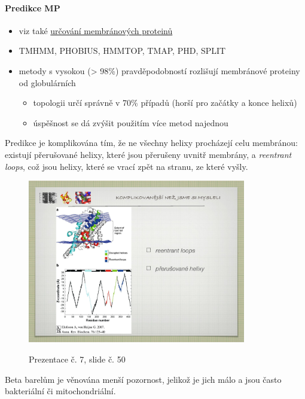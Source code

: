 \documentclass[DIV=8]{scrreprt}
\begin{document}
\paragraph{Predikce MP}
\begin{itemize}[nosep]
    \item viz také \href{Určování membránových proteinů}{určování membránových proteinů}
    \item TMHMM, PHOBIUS, HMMTOP, TMAP, PHD, SPLIT
    \item metody s vysokou (> 98\%) pravděpodobností rozlišují membránové proteiny od globulárních
\begin{itemize}[nosep]
    \item topologii určí správně v 70\% případů (horší pro začátky a konce helixů)
    \item úspěšnost se dá zvýšit použitím více metod najednou
\end{itemize}

\end{itemize}



Predikce je komplikována tím, že ne všechny helixy procházejí celu membránou: existují přerušované helixy, které jsou přerušeny uvnitř membrány, a \emph{reentrant loops}, což jsou helixy, které se vrací zpět na stranu, ze které vyšly. \begin{figure}
    \caption{Prezentace č. 7, slide č. 50}
    \includegraphics[width=0.85\textwidth]{slides-7/slide-50.jpg}
    \centering
    \label{slides-7-slide-50}
\end{figure}


Beta barelům je věnována menší pozornost, jelikož je jich málo a jsou často bakteriální či mitochondriální.
\end{document}
